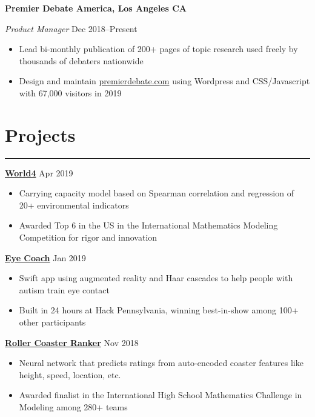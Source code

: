 \documentclass[11pt]{article}
\newcommand{\resumesection}[1]{\vspace{-0.3cm}\section*{\color{highlight}#1}\vspace{-0.3cm}\hrule\vspace{0.3cm}}
\begin{document}
\textbf{Premier Debate America, Los Angeles \hfill CA} \par
\textit{Product Manager} \hfill Dec 2018--Present \par
\begin{itemize}
	\item Lead bi-monthly publication of 200+ pages of topic research used freely by thousands of debaters nationwide
	\item Design and maintain \href{https://www.premierdebate.com/briefs/}{premierdebate.com} using Wordpress and CSS/Javascript with 67,000 visitors in 2019
\end{itemize}

\resumesection{Projects}

\textbf{\href{https://github.com/gautomdas/IMMC-World4/blob/master/US-9365.pdf}{World4}} \hfill Apr 2019\par
\begin{itemize}
	\item Carrying capacity model based on Spearman correlation and regression of 20+ environmental indicators
	\item Awarded Top 6 in the US in the International Mathematics Modeling Competition for rigor and innovation
\end{itemize}\vspace{0.1cm} \par

\textbf{\href{https://github.com/gautomdas/eye-coach}{Eye Coach}} \hfill Jan 2019 \par

\begin{itemize}
	\item Swift app using augmented reality and Haar cascades to help people with autism train eye contact
	\item Built in 24 hours at Hack Pennsylvania, winning best-in-show among 100+ other participants
\end{itemize}\vspace{0.1cm} \par

\textbf{\href{https://github.com/prayaggordy/HiMCM}{Roller Coaster Ranker}}  \hfill Nov 2018\par

\begin{itemize}
	\item Neural network that predicts ratings from auto-encoded coaster features like height, speed, location, etc.
	\item Awarded finalist in the International High School Mathematics Challenge in Modeling among 280+ teams
\end{itemize}\par
\end{document}
